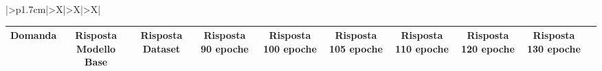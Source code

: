 \documentclass{article}
\begin{document}
\renewcommand{\arraystretch}{1.7}  %

\begin{table}[ht]
\centering
\begin{tabularx}{\textwidth}{|>{\centering{}}p{1.7cm}|>{\centering\arraybackslash}X|>{\centering\arraybackslash}X|>{\centering\arraybackslash}X|}   %
\hline
{}  %
\hline
\begin{tabular}{|c|c|c|c|c|c|c|c|c|c|}
\hline
Domanda & Risposta Modello Base & Risposta Dataset & Risposta 90 epoche & Risposta 100 epoche & Risposta 105 epoche & Risposta 110 epoche & Risposta 120 epoche & Risposta 130 epoche \\
\hline

\end{tabular}
\end{tabularx}
\end{table}
\end{document}
